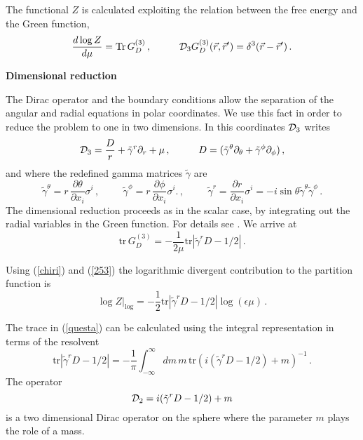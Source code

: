 \documentclass[11pt]{article}
\begin{document}
The functional $Z$ is calculated exploiting the relation between the free energy and the Green function, 
\begin{equation}
\frac{d\log Z}{d\mu}=\textrm{Tr} \, G_D^{(3)}\,,\hspace{1cm}{\cal D}_3 G_D^{(3)}(\vec{r},\vec{r}^\prime) =\delta^3(\vec{r}-\vec{r}^\prime)\,.\label{chiri}
\end{equation}

\smallskip 

\noindent\textbf{Dimensional reduction}

\noindent The Dirac operator and the boundary conditions allow the separation of the angular and radial equations in polar coordinates. We use this fact in order to reduce the problem to one in two dimensions. 
In this coordinates ${\cal D}_3$ writes
\begin{equation}
	{\cal D}_3=\frac{D}{r}+\tilde{\gamma}^r\partial_r+\mu\,,
\hspace{1cm} D=(\tilde{\gamma}^{\theta}\partial_{\theta}+\tilde{\gamma}^{\phi}\partial_{\phi})\,,
\label{253}\end{equation}
and where the redefined gamma matrices $\tilde{\gamma}$ are 
\begin{equation}
\tilde{\gamma}^{\theta}=r\, \frac{\partial\theta}{\partial x_i} \sigma^i \,,\hspace{1cm}
\tilde{\gamma}^{\phi}=r\, \frac{\partial\phi}{\partial x_i} \sigma^i.\,,\hspace{1cm}
\tilde{\gamma}^{r}=\frac{\partial r}{\partial x_i} \sigma^i=-i\sin\theta\tilde{\gamma}^{\theta}\tilde{\gamma}^{\phi}\,.
\end{equation}
The dimensional reduction proceeds as in the scalar case, by integrating out the radial variables in the Green function. For details see \cite{log1}. We arrive at
\begin{equation}
\textrm{tr} \, G^{(3)}_D=-\frac{1}{2 \mu} \textrm{tr}\left|\tilde{\gamma}^rD-1/2\right|\,.\label{qwqw}
\end{equation}

Using (\ref{chiri}) and (\ref{253}) the logarithmic divergent contribution to the partition function  is
\begin{equation}
\log Z|_{\log}=-\frac{1}{2} \textrm{tr}\left|\tilde{\gamma}^rD-1/2\right| \log (\epsilon \mu)\,.\label{questa}
\end{equation}

The trace in (\ref{questa}) can be calculated using the integral representation in terms of the resolvent \cite{seeley} 
\begin{equation}
\textrm{tr}\left|\tilde{\gamma}^r D-1/2\right|=-\frac{1}{\pi}\int^{\infty}_{-\infty}dm\,m\, \textrm{tr}(i(\tilde{\gamma}^rD-1/2)+m)^{-1}\,.\label{refe1}
\end{equation}
The operator 
\begin{equation}
{\cal D}_2=i(\tilde{\gamma}^r D-1/2)+ m\label{dira}
\end{equation}
 is a two dimensional Dirac operator on the sphere where the parameter $m$ plays the role of a mass.
\end{document}
